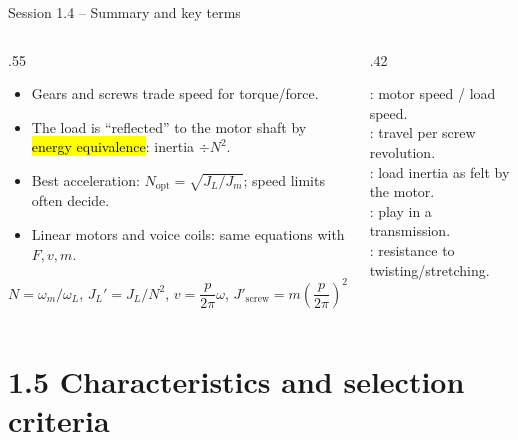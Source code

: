 \documentclass[aspectratio=169,10pt]{beamer}
\begin{document}
\begin{frame}{Session 1.4 -- Summary and key terms}
\begin{columns}[T]
\begin{column}{.55\textwidth}
\small
\begin{itemize}
\item Gears and screws trade speed for torque/force.
\item The load is ``reflected'' to the motor shaft by \hl{energy equivalence}: inertia $\div N^2$.
\item Best acceleration: $N_\text{opt}=\sqrt{J_L/J_m}$; speed limits often decide.
\item Linear motors and voice coils: same equations with $F,v,m$.
\end{itemize}
\begin{keybox}[Remember]
$N=\omega_m/\omega_L$, \; $J_L'=J_L/N^2$, \; $v=\dfrac{p}{2\pi}\omega$, \; $J'_\text{screw}=m\left(\dfrac{p}{2\pi}\right)^2$
\end{keybox}
\end{column}
\begin{column}{.42\textwidth}
\begin{defbox}
\small
{}: motor speed / load speed.\\
: travel per screw revolution.\\
: load inertia as felt by the motor.\\
: play in a transmission.\\
: resistance to twisting/stretching.
\end{defbox}
\end{column}
\end{columns}
\end{frame}

\section{1.5 Characteristics and selection criteria}
\end{document}

